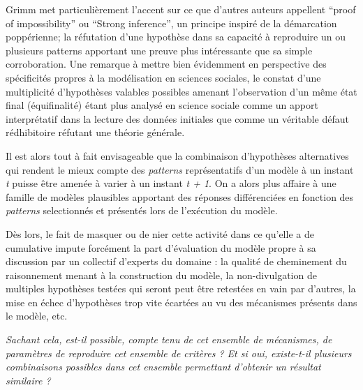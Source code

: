 Grimm met particulièrement l'accent sur ce que d'autres auteurs appellent \foreignquote{english}{proof of impossibility} \autocites{Cottineau2014b, Hedstrom2010} ou \foreignquote{english}{Strong inference}, un principe inspiré de la démarcation poppérienne; la réfutation d'une hypothèse dans sa capacité à reproduire un ou plusieurs patterns apportant une preuve plus intéressante que sa simple corroboration. Une remarque à mettre bien évidemment en perspective des spécificités propres à la modélisation en sciences sociales, le constat d'une multiplicité d'hypothèses valables possibles amenant l'observation d'un même état final (équifinalité) étant plus analysé en science sociale comme un apport interprétatif dans la lecture des données initiales que comme un véritable défaut rédhibitoire réfutant une théorie générale. 

Il est alors tout à fait envisageable que la combinaison d'hypothèses alternatives qui rendent le mieux compte des \textit{patterns} représentatifs d'un modèle à un instant \textit{t} puisse être amenée à varier à un instant \textit{t + 1}. On a alors plus affaire à une famille de modèles plausibles apportant des réponses différenciées en fonction des \textit{patterns} selectionnés et présentés lors de l'exécution du modèle.

Dès lors, le fait de masquer ou de nier cette activité dans ce qu'elle a de cumulative impute forcément la part d'évaluation du modèle propre à sa discussion par un collectif d'experts du domaine : la qualité de cheminement du raisonnement menant à la construction du modèle, la non-divulgation de multiples hypothèses testées qui seront peut être retestées en vain par d'autres, la mise en échec d'hypothèses trop vite écartées au vu des mécanismes présents dans le modèle, etc.



\textit{Sachant cela, est-il possible, compte tenu de cet ensemble de mécanismes, de paramètres de reproduire cet ensemble de critères ? Et si oui, existe-t-il plusieurs combinaisons possibles dans cet ensemble permettant d'obtenir un résultat similaire ?}

